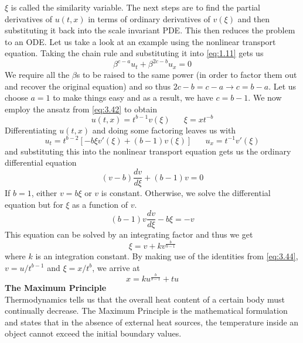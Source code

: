 \documentclass{article}
\newcommand{\od}[2]{\frac{d #1}{d #2}}
\numberwithin{equation}{section}
\begin{document}
$\xi$ is called the similarity variable. The next steps are to find the partial derivatives of $u(t,x)$ in terms of ordinary derivatives of $v(\xi)$ and then substituting it back into the scale invariant PDE. This then reduces the problem to an ODE. Let us take a look at an example using the nonlinear transport equation. Taking the chain rule and substituting it into \eqref{eq:1.11} gets us 
\begin{equation}
    \beta^{c-a}u_t+\beta^{2c-b}u_{x} = 0
\end{equation}
We require all the $\beta$s to be raised to the same power (in order to factor them out and recover the original equation) and so thus $2c-b=c-a \rightarrow c=b-a$. Let us choose $a=1$ to make things easy and as a result, we have $c=b-1$. We now employ the ansatz from \eqref{eq:3.42} to obtain 
\begin{equation}
    u(t,x) =t^{b-1}v(\xi) \hspace{20pt} \xi =xt^{-b} \label{eq:3.44}
\end{equation}
Differentiating $u(t,x)$ and doing some factoring leaves us with 
\begin{equation}
    u_t =t^{b-2}[-b\xi v'(\xi)+(b-1)v(\xi)] \hspace{20pt} u_x=t^{-1}v'(\xi)
\end{equation}
and substituting this into the nonlinear transport equation gets us the ordinary differential equation
\begin{equation}
    (v-b)\od{v}{\xi} +(b-1)v=0
\end{equation}
If $b=1$, either $v=b\xi$ or $v$ is constant. Otherwise, we solve the differential equation but for $\xi$ as a function of $v$. 
\begin{equation*}
    (b-1)v\od{v}{\xi} -b\xi=-v
\end{equation*}
This equation can be solved by an integrating factor and thus we get 
\begin{equation*}
    \xi=v+kv^\frac{b}{b-1}
\end{equation*}
where $k$ is an integration constant. By making use of the identities from \eqref{eq:3.44}, $v=u/t^{b-1}$ and $\xi =x/t^b$, we arrive at 
\begin{equation*}
    x=ku^\frac{b}{b-1}+tu
\end{equation*}
\textbf{The Maximum Principle}\\
Thermodynamics tells us that the overall heat content of a certain body must continually decrease. The Maximum Principle is the mathematical formulation and states that in the absence of external heat sources, the temperature inside an object cannot exceed the initial boundary values.
\end{document}
